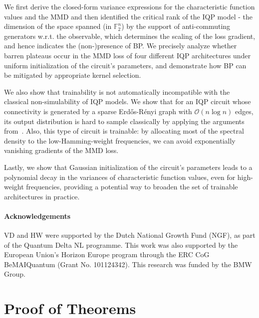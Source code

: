 \documentclass[10pt, twocolumn, a4paper]{article}
\theoremstyle{plain}
\theoremstyle{definition}
\theoremstyle{remark}
\begin{document}
We first derive the closed-form variance expressions for the characteristic function values and the MMD and then identified the critical rank of the IQP model - the dimension of the space spanned (in $\mathbb{F}_2^n$) by the support of anti-commuting generators w.r.t. the observable, which determines the scaling of the loss gradient, and hence indicates the (non-)presence of BP. We precisely analyze whether barren plateaus occur in the MMD loss of four different IQP architectures under uniform initialization of the circuit's parameters, and demonstrate how BP can be mitigated by appropriate kernel selection.

We also show that trainability is not automatically incompatible with the classical non-simulability of IQP models. We show that for an IQP circuit whose connectivity is generated by a sparse Erd\H os-R\'enyi graph with $\mathcal{O}(n\log n)$ edges, its output distribution is hard to sample classically by applying the arguments from~\cite{Bremner17}. Also, this type of circuit is trainable: by allocating most of the spectral density to the low-Hamming-weight frequencies, we can avoid exponentially vanishing gradients of the MMD loss.

Lastly, we show that Gaussian initialization of the circuit's parameters leads to a polynomial decay in the variances of characteristic function values, even for high-weight frequencies, providing a potential way to broaden the set of trainable architectures in practice.

\paragraph{Acknowledgements} VD and HW were supported by the Dutch National Growth Fund (NGF), as part of the Quantum Delta NL programme.
This work was also supported by the European Union’s Horizon Europe program through the ERC CoG BeMAIQuantum (Grant No. 101124342). This research was funded by the BMW Group. 


\newpage
\appendix
\onecolumn
\section{Proof of Theorems}
\end{document}
